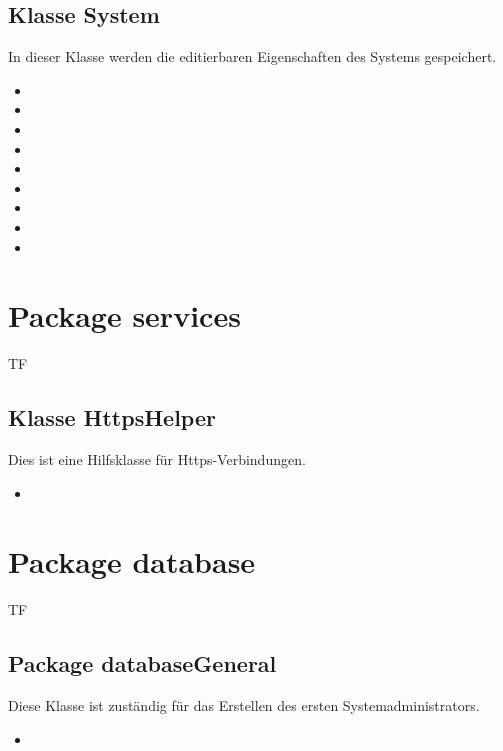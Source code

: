 	
	\subsection{Klasse System}
	In dieser Klasse werden die editierbaren Eigenschaften des Systems gespeichert.
	\begin{itemize}
		\item {}
		\item {}
		\item {}
		\item {}
		\item {}
		\item {}
		\item {}
		\item {}
		\item {}
	\end{itemize}
	
	\section{Package services}
	\begin{tiny}
		TF
	\end{tiny}
	\subsection{Klasse HttpsHelper}
	Dies ist eine Hilfsklasse für Https-Verbindungen.
	\begin{itemize}
		\item {}
	\end{itemize}
		
	
	\section{Package database}
	\begin{tiny}
		TF
	\end{tiny}
	\subsection{Package databaseGeneral}
	
	Diese Klasse ist zuständig für das Erstellen des ersten Systemadministrators.
	\begin{itemize}
		\item {}
	\end{itemize}
	

